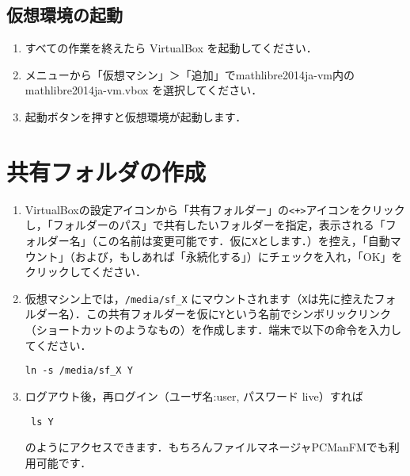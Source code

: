 \documentclass[a4j]{jsarticle}
\newcommand{\vm}{mathlibre2014ja-vm}
\begin{document}

\subsection{仮想環境の起動}
\begin{enumerate}
 \item すべての作業を終えたら VirtualBox を起動してください．
 \item メニューから「仮想マシン」＞「追加」で\vm 内の \vm.vbox を選択してください．
 \item 起動ボタンを押すと仮想環境が起動します．
\end{enumerate}

\section{共有フォルダの作成}
\begin{enumerate}
 \item VirtualBoxの設定アイコンから「共有フォルダー」の\verb|<+>|アイコンをクリックし，「フォルダーのパス」で共有したいフォルダーを指定，表示される「フォルダー名」（この名前は変更可能です．仮に\verb|X|とします．）を控え，「自動マウント」（および，もしあれば「永続化する」）にチェックを入れ，「OK」をクリックしてください．
 \item 仮想マシン上では，\verb|/media/sf_X| にマウントされます（\verb|X|は先に控えたフォルダー名）．この共有フォルダーを仮に\verb|Y|という名前でシンボリックリンク（ショートカットのようなもの）を作成します．端末で以下の命令を入力してください．
\begin{lstlisting}
ln -s /media/sf_X Y
\end{lstlisting}
\item ログアウト後，再ログイン（ユーザ名:user, パスワード live）すれば
\begin{lstlisting}
 ls Y
\end{lstlisting}
のようにアクセスできます．もちろんファイルマネージャPCManFMでも利用可能です．
\end{enumerate}

\end{document}
